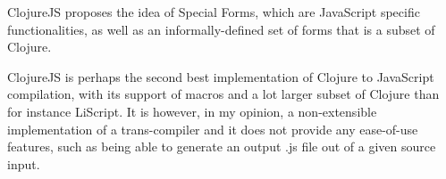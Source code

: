 ClojureJS proposes the idea of Special Forms, which are JavaScript specific functionalities, as well as an informally-defined set of forms that is a subset of Clojure.

ClojureJS is perhaps the second best implementation of Clojure to JavaScript compilation, with its support of macros and a lot larger subset of Clojure than for instance LiScript. 
It is however, in my opinion, a non-extensible implementation of a trans-compiler and it does not provide any ease-of-use features, such as being able to generate an output .js file out of a given source input. 
